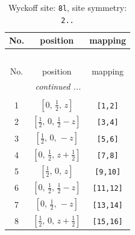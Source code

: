 \documentclass[fleqn,8pt]{jsarticle}
\begin{document}
\begin{longtable}{ccc}
\caption{Wyckoff site: {\tt 8l}, site symmetry: {\tt 2..}}
 \\
 \hline \hline
No. & position & mapping \\ \hline \endfirsthead

\multicolumn{2}{l}{\tablename\ \thetable{}} \\
 \hline \hline
No. & position & mapping \\ \hline \endhead

 \hline \hline
\multicolumn{2}{r}{\footnotesize\it continued ...} \\ \endfoot

 \hline \hline
\multicolumn{2}{r}{} \\ \endlastfoot

1 & $\left[ 0,\, \frac{1}{2},\, z \right]$ & {\tt [1,2]} \\ \hline
2 & $\left[ \frac{1}{2},\, 0,\, \frac{1}{2} - z \right]$ & {\tt [3,4]} \\ \hline
3 & $\left[ \frac{1}{2},\, 0,\, - z \right]$ & {\tt [5,6]} \\ \hline
4 & $\left[ 0,\, \frac{1}{2},\, z + \frac{1}{2} \right]$ & {\tt [7,8]} \\ \hline
5 & $\left[ \frac{1}{2},\, 0,\, z \right]$ & {\tt [9,10]} \\ \hline
6 & $\left[ 0,\, \frac{1}{2},\, \frac{1}{2} - z \right]$ & {\tt [11,12]} \\ \hline
7 & $\left[ 0,\, \frac{1}{2},\, - z \right]$ & {\tt [13,14]} \\ \hline
8 & $\left[ \frac{1}{2},\, 0,\, z + \frac{1}{2} \right]$ & {\tt [15,16]} \\
\end{longtable}
\renewcommand{\arraystretch}{1.2}
\end{document}
